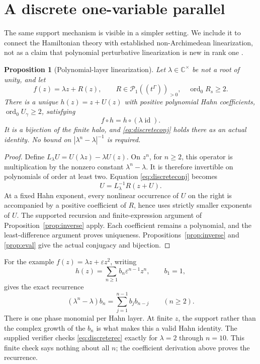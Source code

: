\documentclass[11pt,letterpaper]{article}
\numberwithin{equation}{section}
\newtheorem{proposition}[theorem]{Proposition}
\theoremstyle{definition}
\theoremstyle{remark}
\newcommand{\C}{\mathbb C}
\newcommand{\Pp}{\mathscr P}
\newcommand{\id}{\operatorname{id}}
\newcommand{\ord}{\operatorname{ord}}
\newcommand{\HH}[1]{#1((t^\Gamma))}
\begin{document}
\section{A discrete one-variable parallel}
\label{sec:discrete}
The same support mechanism is visible in a simpler setting. We include it
to connect the Hamiltonian theory with established non-Archimedean
linearization, not as a claim that polynomial perturbative linearization is
new in rank one \cite{lindahl}.

\begin{proposition}[Polynomial-layer linearization]\label{prop:discrete}
Let $\lambda\in\C^\times$ be not a root of unity, and let
\[
 f(z)=\lambda z+R(z),\qquad R\in\HH{\Pp_1}_{>0},
 \quad\ord_0R_s\ge2.
\]
There is a unique $h(z)=z+U(z)$ with positive polynomial Hahn coefficients,
$\ord_0U_\gamma\ge2$, satisfying
\begin{equation}\label{eq:discreteconj}
 f\circ h=h\circ(\lambda\id).
\end{equation}
It is a bijection of the finite halo, and \eqref{eq:discreteconj} holds
there as an actual identity. No bound on $|\lambda^n-\lambda|^{-1}$ is
required.
\end{proposition}
\begin{proof}
Define $L_\lambda U=U(\lambda z)-\lambda U(z)$. On $z^n$, for $n\ge2$,
this operator is multiplication by the nonzero constant
$\lambda^n-\lambda$. It is therefore invertible on polynomials of order at
least two. Equation \eqref{eq:discreteconj} becomes
\[
 U=L_\lambda^{-1}R(z+U).
\]
At a fixed Hahn exponent, every nonlinear occurrence of $U$ on the right
is accompanied by a positive coefficient of $R$, hence uses strictly
smaller exponents of $U$. The supported recursion and finite-expression
argument of Proposition~\ref{prop:inverse} apply. Each coefficient remains
a polynomial, and the least-difference argument proves uniqueness.
Propositions~\ref{prop:inverse} and \ref{prop:eval} give the actual
conjugacy and bijection.
\end{proof}
For the example $f(z)=\lambda z+\varepsilon z^2$, writing
\[
 h(z)=\sum_{n\ge1}b_n\varepsilon^{n-1}z^n,\qquad b_1=1,
\]
gives the exact recurrence
\begin{equation}\label{eq:discreterec}
 (\lambda^n-\lambda)b_n=\sum_{j=1}^{n-1}b_jb_{n-j}\qquad(n\ge2).
\end{equation}
There is one phase monomial per Hahn layer. At finite $z$, the support
rather than the complex growth of the $b_n$ is what makes this a valid Hahn
identity. The supplied verifier checks \eqref{eq:discreterec} exactly for
$\lambda=2$ through $n=10$. This finite check says nothing about all $n$;
the coefficient derivation above proves the recurrence.
\end{document}
